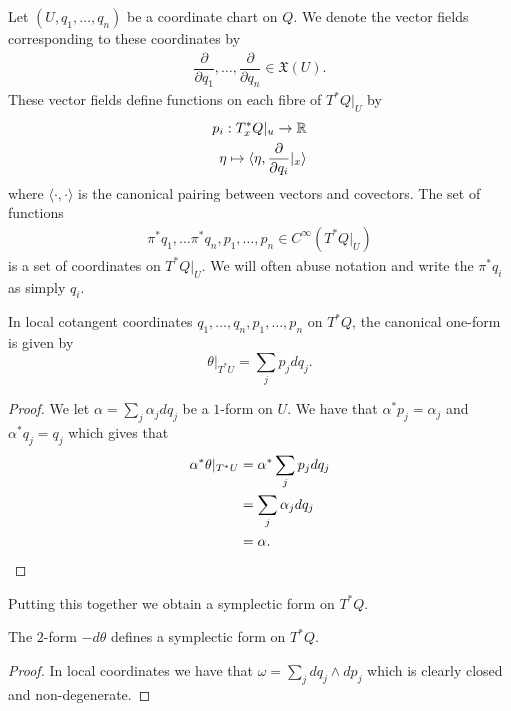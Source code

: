 \begin{eg}
    Let $(U, q_1, \dots, q_n)$ be a coordinate chart on $Q$. We denote the vector
    fields corresponding to these coordinates by
    \begin{align*}
        \dfrac{\partial}{\partial q_1}, \dots ,  \dfrac{\partial}{\partial q_n} \in \mathfrak{X}(U).
    \end{align*}
    These vector fields define functions on each fibre of $T^*Q|_U$ by
    \begin{align*}
        p_i : T^*_xQ|_u \to \mathbb{R} \\
        \eta \mapsto \langle \eta, \dfrac{\partial}{\partial q_i}|_x \rangle
    \end{align*}
    where $\langle \cdot , \cdot \rangle$ is the canonical pairing between vectors and covectors. The  set of functions
    \begin{align*}
        \pi^*q_1, \dots \pi^* q_n, p_1, \dots , p_n \in C^{\infty}(T^*Q|_U)
    \end{align*}
    is a set of coordinates on $T^*Q|_U$. We will often abuse notation and write the $\pi^* q_i$ as simply $q_i$.
    \begin{lemma}
        In local cotangent coordinates $q_1, \dots , q_n, p_1, \dots , p_n$ on $T^*Q$, the canonical one-form is given by
        $$\theta|_{T^*U} = \sum_j p_j dq_j.$$
    \end{lemma}
    \begin{proof}
        We let $\alpha = \sum_j \alpha_j dq_j$ be a $1$-form on $U$. We have that $\alpha^*p_j = \alpha_j$ and $\alpha^*q_j = q_j$ which gives that
        \begin{align*}
            \alpha^*\theta|_{T^*U} & = \alpha^* \sum_j p_j dq_j \\
                                   & =\sum_j \alpha_j dq_j      \\
                                   & = \alpha.\qedhere
        \end{align*}
    \end{proof}

    Putting this together we obtain a symplectic form on $T^*Q$.
    \begin{theorem}
        The $2$-form $-d\theta$ defines a symplectic form on $T^*Q$.
    \end{theorem}
    \begin{proof}
        In local coordinates we have that $\omega = \sum_j dq_j \wedge dp_j$ which is clearly closed and non-degenerate.
    \end{proof}
\end{eg}

